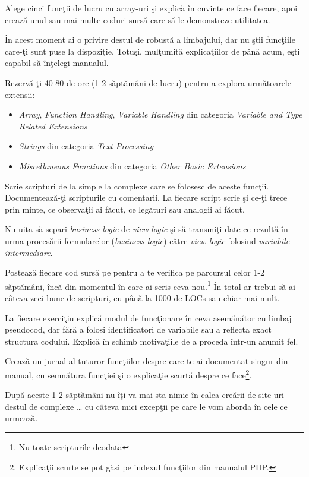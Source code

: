 \begin{Exercise}[title={Înţelege manualul}]
Alege cinci funcţii de lucru cu array-uri şi
explică în cuvinte ce face fiecare, apoi crează
unul sau mai multe coduri sursă care să le demonstreze
utilitatea.
\end{Exercise}
\begin{Exercise}[difficulty=3,title={Explorează manualul}]
În acest moment ai o privire destul de robustă a
limbajului, dar nu ştii funcţiile care-ţi sunt
puse la dispoziţie. Totuşi, mulţumită explicaţiilor
de până acum, eşti capabil să înţelegi manualul.

Rezervă-ţi 40-80 de ore (1-2 săptămâni de lucru)
pentru a explora următoarele extensii:
\begin{itemize}
\item \textit{Array},
\textit{Function Handling}, \textit{Variable Handling} din categoria \textit{Variable and Type Related Extensions}
\item \textit{Strings} din categoria \textit{Text Processing}
\item \textit{Miscellaneous Functions} din categoria \textit{Other Basic Extensions}
\end{itemize}
Scrie scripturi de la simple la complexe care se folosesc
de aceste funcţii. Documentează-ţi scripturile cu comentarii.
La fiecare script scrie şi ce-ţi trece prin minte, ce observaţii
ai făcut, ce legături sau analogii ai făcut.

Nu uita să separi \textit{business logic} de \textit{view logic} şi să transmiţi date ce
rezultă în urma procesării formularelor (\textit{business logic}) către \textit{view logic}
folosind \textit{variabile intermediare}.

Postează fiecare cod sursă pe {\phpro} pentru a te verifica pe parcursul
celor 1-2 săptămâni, încă din momentul în care ai scris ceva nou.\footnote{Nu toate
scripturile deodată} În total ar trebui să ai câteva zeci bune de scripturi, cu
până la 1000 de LOCs sau chiar mai mult.

La fiecare exerciţiu explică modul de funcţionare \^in ceva asemănător cu
limbaj pseudocod, dar fără a folosi identificatori de variabile
sau a reflecta exact structura codului. Explică \^in schimb motivaţiile
de a proceda \^intr-un anumit fel.

Crează un jurnal al tuturor funcţiilor despre care te-ai documentat
singur din manual, cu semnătura funcţiei şi o explicaţie scurtă
despre ce face\footnote{Explicaţii scurte se pot găsi pe indexul
funcţiilor din manualul PHP.}.

După aceste 1-2 săptămâni nu îţi va mai sta nimic în calea creării
de site-uri destul de complexe {\ldots} cu câteva mici excepţii pe care le vom
aborda \^in cele ce urmează.
\end{Exercise}



